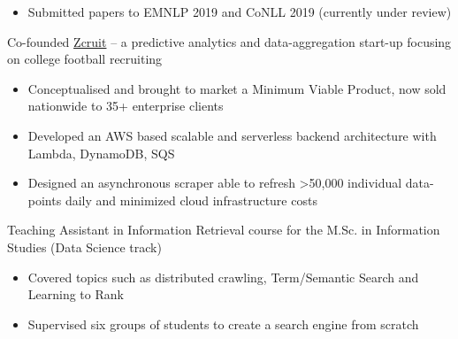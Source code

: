 \documentclass[10pt,a4paper,ragged2e]{altacv}
\begin{document}
\begin{itemize}
\item Submitted papers to EMNLP 2019 and CoNLL 2019 (currently under review)
\end{itemize}

Co-founded \href{https://www.zcruit.com/}{Zcruit} -- a predictive analytics and data-aggregation start-up focusing on college football recruiting

\begin{itemize}
\item Conceptualised and brought to market a Minimum Viable Product, now sold nationwide to 35+ enterprise clients
\item Developed an AWS based scalable and serverless backend architecture with Lambda, DynamoDB, SQS
\item Designed an asynchronous scraper able to refresh >50,000 individual data-points daily and minimized cloud infrastructure costs
\end{itemize}

Teaching Assistant in Information Retrieval course for the M.Sc. in Information Studies (Data Science track) 
\begin{itemize}
	\item Covered topics such as distributed crawling, Term/Semantic Search and Learning to Rank
	\item Supervised six groups of students to create a search engine from scratch
\end{itemize}

\clearpage
\end{document}

